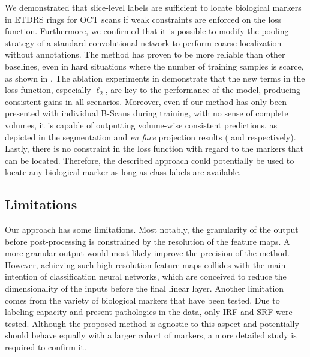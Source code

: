 We demonstrated that slice-level labels are sufficient to locate biological markers in ETDRS rings for OCT scans if weak constraints are enforced on the loss function. Furthermore, we confirmed that it is possible to modify the pooling strategy of a standard convolutional network to perform coarse localization without annotations. The method has proven to be more reliable than other baselines, even in hard situations where the number of training samples is scarce, as shown in . The ablation experiments in  demonstrate that the new terms in the loss function, especially $\ell_2$, are key to the performance of the model, producing consistent gains in all scenarios. Moreover, even if our method has only been presented with individual B-Scans during training, with no sense of complete volumes, it is capable of outputting volume-wise consistent predictions, as depicted in the segmentation and \textit{en face} projection results ( and  respectively). Lastly, there is no constraint in the loss function with regard to the markers that can be located. Therefore, the described approach could potentially be used to locate any biological marker as long as class labels are available.

\subsection{Limitations}
Our approach has some limitations. Most notably, the granularity of the output before post-processing is constrained by the resolution of the feature maps. A more granular output would most likely improve the precision of the method. However, achieving such high-resolution feature maps collides with the main intention of classification neural networks, which are conceived to reduce the dimensionality of the inputs before the final linear layer. Another limitation comes from the variety of biological markers that have been tested. Due to labeling capacity and present pathologies in the data, only IRF and SRF were tested. Although the proposed method is agnostic to this aspect and potentially should behave equally with a larger cohort of markers, a more detailed study is required to confirm it.
